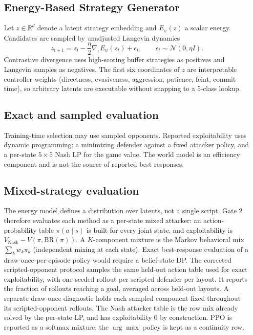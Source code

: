 \documentclass[11pt]{article}
\begin{document}
\subsection{Energy-Based Strategy Generator}

Let $z\in\mathbb{R}^d$ denote a latent strategy embedding and $E_\psi(z)$ a scalar energy.
Candidates are sampled by unadjusted Langevin dynamics
\[
z_{t+1}=z_t-\frac{\eta}{2}\nabla_z E_\psi(z_t)+\epsilon_t,\qquad \epsilon_t\sim\mathcal{N}(0,\eta I).
\]
Contrastive divergence uses high-scoring buffer strategies as positives and Langevin samples as negatives.
The first six coordinates of $z$ are interpretable controller weights (directness, evasiveness, aggression, patience, feint, commit time), so arbitrary latents are executable without snapping to a 5-class lookup.

\subsection{Exact and sampled evaluation}

Training-time selection may use sampled opponents.
Reported exploitability uses dynamic programming: a minimizing defender against a fixed attacker policy, and a per-state $5\times 5$ Nash LP for the game value.
The world model is an efficiency component and is not the source of reported best responses.

\subsection{Mixed-strategy evaluation}

The energy model defines a distribution over latents, not a single script.
Gate 2 therefore evaluates each method as a per-state mixed attacker: an action-probability table $\pi(a\mid s)$ is built for every joint state, and exploitability is $V_{\mathrm{Nash}}-V(\pi,\mathrm{BR}(\pi))$.
A $K$-component mixture is the Markov behavioral mix $\sum_k w_k\pi_k$ (independent mixing at each state).
Exact best-response evaluation of a draw-once-per-episode policy would require a belief-state DP.
The corrected scripted-opponent protocol samples the same held-out action table used for exact exploitability, with one seeded rollout per scripted defender per layout. It reports the fraction of rollouts reaching a goal, averaged across held-out layouts.
A separate draw-once diagnostic holds each sampled component fixed throughout its scripted-opponent rollouts.
The Nash attacker table is the row mix already solved by the per-state LP, and has exploitability $0$ by construction.
PPO is reported as a softmax mixture; the $\arg\max$ policy is kept as a continuity row.
\end{document}
